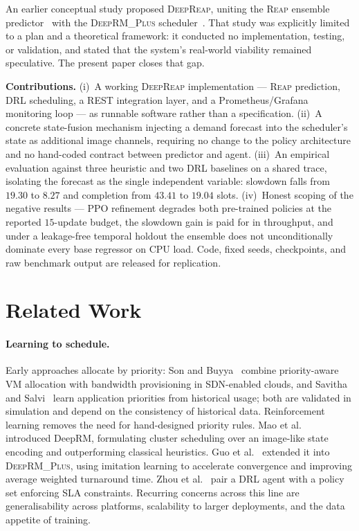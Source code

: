 \documentclass[runningheads]{llncs}
\newcommand{\reap}{\textsc{Reap}}
\newcommand{\deeprm}{\textsc{DeepRM\_Plus}}
\newcommand{\deepreap}{\textsc{DeepReap}}
\begin{document}
An earlier conceptual study proposed \deepreap{}, uniting the \reap{}
ensemble predictor~\cite{kaur2019} with the \deeprm{}
scheduler~\cite{guo2021}. That study was explicitly limited to a plan
and a theoretical framework: it conducted no implementation, testing,
or validation, and stated that the system's real-world viability
remained speculative. The present paper closes that gap.

\textbf{Contributions.}
(i)~A working \deepreap{} implementation --- \reap{} prediction, DRL
scheduling, a REST integration layer, and a Prometheus/Grafana
monitoring loop --- as runnable software rather than a specification.
(ii)~A concrete state-fusion mechanism injecting a demand forecast into
the scheduler's state as additional image channels, requiring no change
to the policy architecture and no hand-coded contract between predictor
and agent. (iii)~An empirical evaluation against three heuristic and
two DRL baselines on a shared trace, isolating the forecast as the
single independent variable: slowdown falls from $19.30$ to $8.27$ and
completion from $43.41$ to $19.04$ slots. (iv)~Honest scoping of the
negative results --- PPO refinement degrades both pre-trained policies
at the reported $15$-update budget, the slowdown gain is paid for in
throughput, and under a leakage-free temporal holdout the ensemble does
not unconditionally dominate every base regressor on CPU load. Code,
fixed seeds, checkpoints, and raw benchmark output are released for
replication.

\section{Related Work}
\paragraph{Learning to schedule.} Early approaches allocate by
priority: Son and Buyya~\cite{son2019} combine priority-aware VM
allocation with bandwidth provisioning in SDN-enabled clouds, and
Savitha and Salvi~\cite{savitha2021} learn application priorities from
historical usage; both are validated in simulation and depend on the
consistency of historical data. Reinforcement learning removes the need
for hand-designed priority rules. Mao et al.~\cite{mao2016} introduced
DeepRM, formulating cluster scheduling over an image-like state
encoding and outperforming classical heuristics. Guo
et al.~\cite{guo2021} extended it into \deeprm{}, using imitation
learning to accelerate convergence and improving average weighted
turnaround time. Zhou et al.~\cite{zhou2021} pair a DRL agent with a
policy set enforcing SLA constraints. Recurring concerns across this
line are generalisability across platforms, scalability to larger
deployments, and the data appetite of training.
\end{document}
